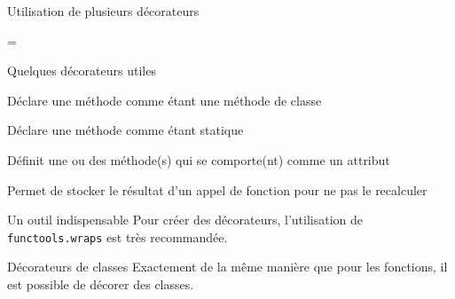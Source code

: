 \begin{frame}{Utilisation de plusieurs décorateurs}
  \begin{center}
    {\Huge =}
  \end{center}
\end{frame}

\begin{frame}{Quelques décorateurs utiles}
  \begin{description}[<+->]
    \item[\texttt{classmethod}] Déclare une méthode comme étant une méthode de classe
    \item[\texttt{staticmethod}] Déclare une méthode comme étant statique
    \item[\texttt{property}] Définit une ou des méthode(s) qui se comporte(nt) comme un attribut
    \item[\texttt{functools.cache}] Permet de stocker le résultat d'un appel de fonction pour ne pas le recalculer
  \end{description}
\end{frame}

\begin{frame}{Un outil indispensable}
  Pour créer des décorateurs, l'utilisation de \texttt{functools.wraps} est \alert{très} recommandée.
\end{frame}

\begin{frame}{Décorateurs de classes}
  Exactement de la même manière que pour les fonctions, il est possible de décorer des classes.
\end{frame}
